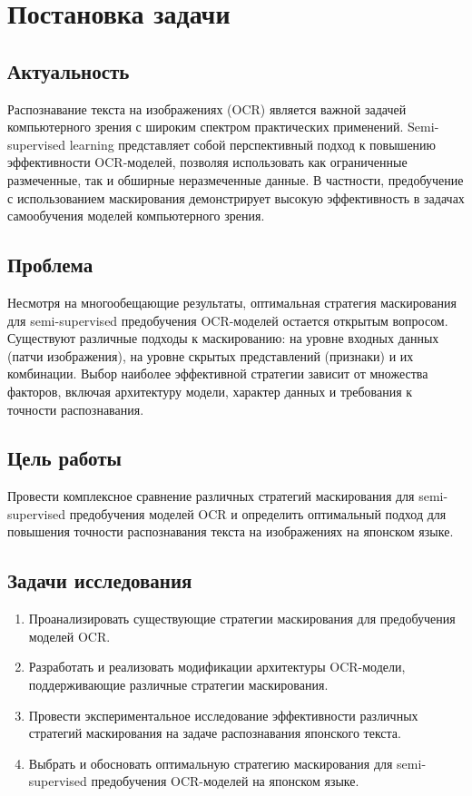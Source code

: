 \section{Постановка задачи}
\label{sec:Chapter1} 


\subsection{Актуальность} 

Распознавание текста на изображениях (OCR) является важной задачей компьютерного зрения с широким спектром практических применений. Semi-supervised learning представляет собой перспективный подход к повышению эффективности OCR-моделей, позволяя использовать как ограниченные размеченные, так и обширные неразмеченные данные. В частности,  предобучение с использованием маскирования демонстрирует высокую эффективность в задачах  самообучения  моделей компьютерного зрения.

\subsection{Проблема}

Несмотря на многообещающие результаты,  оптимальная стратегия  маскирования  для semi-supervised  предобучения OCR-моделей остается открытым вопросом. Существуют  различные  подходы  к маскированию:  на  уровне  входных  данных  (патчи изображения),  на уровне скрытых  представлений  (признаки) и их комбинации.   Выбор наиболее эффективной стратегии  зависит от  множества  факторов,  включая  архитектуру  модели,  характер  данных  и  требования  к  точности распознавания.

\subsection{Цель работы} 

Провести комплексное сравнение различных  стратегий  маскирования  для semi-supervised  предобучения  моделей  OCR  и определить оптимальный подход для повышения точности распознавания текста на изображениях на японском языке.

\subsection{Задачи исследования}

\begin{enumerate}
  \item Проанализировать существующие  стратегии  маскирования  для предобучения моделей  OCR.
  \item Разработать  и  реализовать  модификации  архитектуры  OCR-модели,  поддерживающие  различные  стратегии  маскирования.
  \item Провести  экспериментальное  исследование  эффективности  различных  стратегий  маскирования  на  задаче  распознавания  японского текста.
  \item Выбрать  и  обосновать  оптимальную  стратегию  маскирования  для semi-supervised  предобучения  OCR-моделей  на  японском  языке. 
\end{enumerate}

